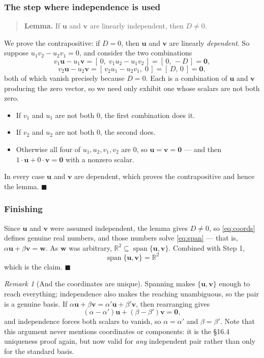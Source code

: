 \documentclass[11pt]{article}
\theoremstyle{definition}
\theoremstyle{remark}
\newtheorem*{rmk}{Remark}
\newcommand{\R}{\mathbb{R}}
\newcommand{\vc}[1]{\mathbf{#1}}
\DeclareMathOperator{\spanop}{span}   %
\begin{document}
\subsubsection*{The step where independence is used}
\begin{quote}
\textbf{Lemma.} If $\vc{u}$ and $\vc{v}$ are linearly independent, then
$D\neq0$.
\end{quote}

\noindent We prove the contrapositive: if $D=0$, then $\vc{u}$ and $\vc{v}$ are
linearly \emph{dependent}. So suppose $u_1v_2-u_2v_1=0$, and consider the two
combinations
\[
  v_1\vc{u} - u_1\vc{v} = [\,0,\;v_1u_2 - u_1v_2\,] = [\,0,\,-D\,] = \vc{0},
\]
\[
  v_2\vc{u} - u_2\vc{v} = [\,v_2u_1 - u_2v_1,\;0\,] = [\,D,\,0\,] = \vc{0},
\]
both of which vanish precisely because $D=0$. Each is a combination of $\vc{u}$
and $\vc{v}$ producing the zero vector, so we need only exhibit one whose
scalars are not both zero.

\begin{itemize}[leftmargin=1.4em,itemsep=2pt,topsep=3pt]
  \item If $v_1$ and $u_1$ are not both $0$, the first combination does it.
  \item If $v_2$ and $u_2$ are not both $0$, the second does.
  \item Otherwise all four of $u_1,u_2,v_1,v_2$ are $0$, so
        $\vc{u}=\vc{v}=\vc{0}$ --- and then $1\cdot\vc{u}+0\cdot\vc{v}=\vc{0}$
        with a nonzero scalar.
\end{itemize}

\noindent In every case $\vc{u}$ and $\vc{v}$ are dependent, which proves the
contrapositive and hence the lemma. \hfill$\blacksquare$

\subsubsection*{Finishing}
Since $\vc{u}$ and $\vc{v}$ were assumed independent, the lemma gives $D\neq0$,
so \eqref{eq:coords} defines genuine real numbers, and those numbers solve
\eqref{eq:span} --- that is, $\alpha\vc{u}+\beta\vc{v}=\vc{w}$. As $\vc{w}$ was
arbitrary,
$\R^{2}\subseteq\spanop\{\vc{u},\vc{v}\}$. Combined with Step 1,
\[
  \boxed{\;\spanop\{\vc{u},\vc{v}\} = \R^{2}\;}
\]
which is the claim. \hfill$\blacksquare$

\begin{rmk}[And the coordinates are unique]
Spanning makes $\{\vc{u},\vc{v}\}$ enough to reach everything; independence also
makes the reaching unambiguous, so the pair is a genuine basis. If
$\alpha\vc{u}+\beta\vc{v}=\alpha'\vc{u}+\beta'\vc{v}$, then rearranging gives
\[
  (\alpha-\alpha')\vc{u} + (\beta-\beta')\vc{v} = \vc{0},
\]
and independence forces both scalars to vanish, so $\alpha=\alpha'$ and
$\beta=\beta'$. Note that this argument never mentions coordinates or
components: it is the \S16.4 uniqueness proof again, but now valid for
\emph{any} independent pair rather than only for the standard basis.
\end{rmk}
\end{document}
